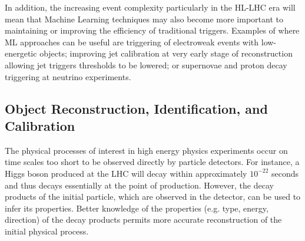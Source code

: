 In addition, the increasing event complexity particularly in the HL-LHC era will mean that Machine Learning techniques may also become more important to maintaining or improving the efficiency of traditional triggers. Examples of where ML approaches can be useful are triggering of electroweak events with low-energetic objects; improving jet calibration at very early stage of reconstruction allowing jet triggers thresholds to be lowered; or supernovae and proton decay triggering at neutrino experiments.



\subsection{Object Reconstruction, Identification, and Calibration}
\label{sec:object-reco-id-calib}


The physical processes of interest in high energy physics experiments occur on time scales too short to be observed directly by particle detectors. For instance, a Higgs boson produced at the LHC will decay within approximately $10^{-22}$ seconds and thus decays essentially at the point of production. However, the decay products of the initial particle, which are observed in the detector, can be used to infer its properties. Better knowledge of the properties (e.g. type, energy, direction) of the decay products permits more accurate reconstruction of the initial physical process.\\

